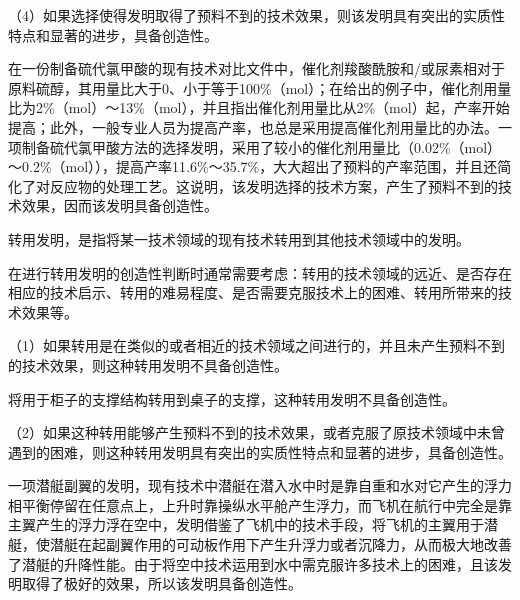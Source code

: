 {\setlength{\parindent}{17.1bp}（4）如果选择使得发明取得了预料不到的技术效果，则该发明具有突出的实质性特点和显著的进步，具备创造性。\par}

{\par}

在一份制备硫代氯甲酸的现有技术对比文件中，催化剂羧酸酰胺和/或尿素相对于原料硫醇，其用量比大于0、小于等于100\%（mol）；在给出的例子中，催化剂用量比为2\%（mol）～13\%（mol），并且指出催化剂用量比从2\%（mol）起，产率开始提高；此外，一般专业人员为提高产率，也总是采用提高催化剂用量比的办法。一项制备硫代氯甲酸方法的选择发明，采用了较小的催化剂用量比（0.02\%（mol）～0.2\%（mol）），提高产率11.6\%～35.7\%，大大超出了预料的产率范围，并且还简化了对反应物的处理工艺。这说明，该发明选择的技术方案，产生了预料不到的技术效果，因而该发明具备创造性。

转用发明，是指将某一技术领域的现有技术转用到其他技术领域中的发明。

在进行转用发明的创造性判断时通常需要考虑：转用的技术领域的远近、是否存在相应的技术启示、转用的难易程度、是否需要克服技术上的困难、转用所带来的技术效果等。

{\setlength{\parindent}{17.1bp}（1）如果转用是在类似的或者相近的技术领域之间进行的，并且未产生预料不到的技术效果，则这种转用发明不具备创造性。\par}

{\par}

将用于柜子的支撑结构转用到桌子的支撑，这种转用发明不具备创造性。

{\setlength{\parindent}{17.1bp}（2）如果这种转用能够产生预料不到的技术效果，或者克服了原技术领域中未曾遇到的困难，则这种转用发明具有突出的实质性特点和显著的进步，具备创造性。\par}

{\par}

一项潜艇副翼的发明，现有技术中潜艇在潜入水中时是靠自重和水对它产生的浮力相平衡停留在任意点上，上升时靠操纵水平舱产生浮力，而飞机在航行中完全是靠主翼产生的浮力浮在空中，发明借鉴了飞机中的技术手段，将飞机的主翼用于潜艇，使潜艇在起副翼作用的可动板作用下产生升浮力或者沉降力，从而极大地改善了潜艇的升降性能。由于将空中技术运用到水中需克服许多技术上的困难，且该发明取得了极好的效果，所以该发明具备创造性。

